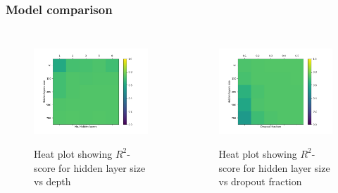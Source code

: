 \documentclass{beamer}
\begin{document}
\begin{frame}
\frametitle{Model comparison}
\begin{columns}

\begin{figure}[h]
    \centering
    \includegraphics[scale=0.4]{heat-plot-depth-vs-width.png}
    \label{fig:mesh1}
    \caption{Heat plot showing $R^2$-score for hidden layer size vs depth}
\end{figure}

\begin{figure}[h]
    \centering
    \includegraphics[scale=0.4]{heat-plot-dropout-vs-width.png}
    \label{fig:mesh2}
    \caption{Heat plot showing $R^2$-score for hidden layer size vs dropout fraction}
\end{figure}

\end{columns}
\end{frame}
\end{document}
